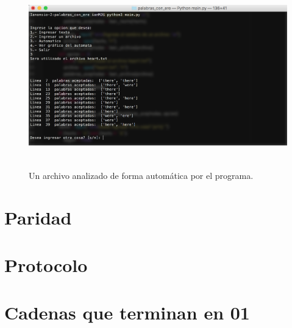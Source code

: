 \documentclass[12pt]{article}
\begin{document}
\begin{figure}[H]
\includegraphics[width=\textwidth, height=8cm]{palabras_ere_auto}
\caption{Un archivo analizado de forma automática por el programa.}
\label{fig:automata_ere_auto}
\end{figure}

\newpage
\section{Paridad}

\newpage
\section{Protocolo}

\newpage
\section{Cadenas que terminan en 01}




\end{document}
